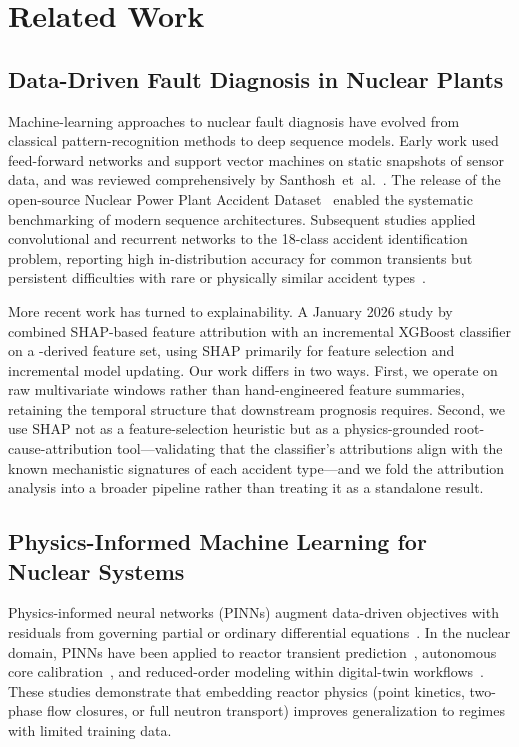 \section{Related Work}
\label{sec:related}

\subsection{Data-Driven Fault Diagnosis in Nuclear Plants}

Machine-learning approaches to nuclear fault diagnosis have evolved from classical pattern-recognition methods to deep sequence models. Early work used feed-forward networks and support vector machines on static snapshots of sensor data, and was reviewed comprehensively by Santhosh~et~al.~\citep{santhosh2019survey}. The release of the open-source Nuclear Power Plant Accident Dataset~\citep{qi2022nppad} enabled the systematic benchmarking of modern sequence architectures. Subsequent studies applied convolutional and recurrent networks to the 18-class accident identification problem, reporting high in-distribution accuracy for common transients but persistent difficulties with rare or physically similar accident types~\citep{wang2023deep,lee2023lstm}.

More recent work has turned to explainability. A January 2026 study by ~\citep{xgboost2026shap} combined SHAP-based feature attribution with an incremental XGBoost classifier on a \nppad-derived feature set, using SHAP primarily for feature selection and incremental model updating. Our work differs in two ways. First, we operate on raw multivariate windows rather than hand-engineered feature summaries, retaining the temporal structure that downstream prognosis requires. Second, we use SHAP not as a feature-selection heuristic but as a physics-grounded root-cause-attribution tool---validating that the classifier's attributions align with the known mechanistic signatures of each accident type---and we fold the attribution analysis into a broader pipeline rather than treating it as a standalone result.

\subsection{Physics-Informed Machine Learning for Nuclear Systems}

Physics-informed neural networks (PINNs) augment data-driven objectives with residuals from governing partial or ordinary differential equations~\citep{raissi2019pinn,karniadakis2021pinn}. In the nuclear domain, PINNs have been applied to reactor transient prediction~\citep{zhang2023pinn}, autonomous core calibration~\citep{song2023calibration}, and reduced-order modeling within digital-twin workflows~\citep{gong2022rom}. These studies demonstrate that embedding reactor physics (point kinetics, two-phase flow closures, or full neutron transport) improves generalization to regimes with limited training data.


